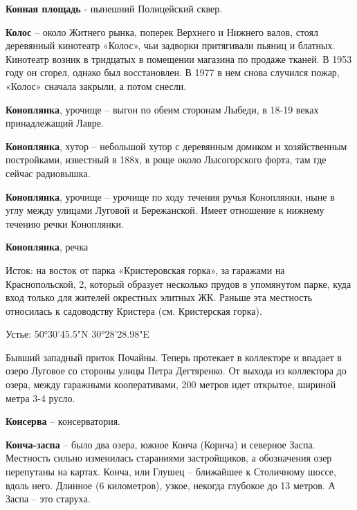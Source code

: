 \medskip

\textbf{Конная площадь} - нынешний Полицейский сквер.\\

\medskip

\textbf{Колос} – около Житнего рынка, поперек Верхнего и Нижнего валов, стоял деревянный кинотеатр «Колос», чьи задворки притягивали пьяниц и блатных. Кинотеатр возник в тридцатых в помещении магазина по продаже тканей. В 1953 году он сгорел, однако был восстановлен. В 1977 в нем снова случился пожар, «Колос» сначала закрыли, а потом снесли.\\

\medskip

\textbf{Коноплянка}, урочище – выгон по обеим сторонам Лыбеди, в 18-19 веках принадлежащий Лавре.\\

\medskip

\textbf{Коноплянка}, хутор – небольшой хутор с деревянным домиком и хозяйственным постройками, известный в 188х, в роще около Лысогорского форта, там где сейчас радиовышка.\\  

\medskip

\textbf{Коноплянка}, урочище – урочище по ходу течения ручья Коноплянки, ныне в углу между улицами Луговой и Бережанской. Имеет отношение к нижнему течению речки Коноплянки.\\

\medskip

\textbf{Коноплянка}, речка

Исток: на восток от парка «Кристеровская горка», за гаражами на Краснопольской, 2, который образует несколько прудов в упомянутом парке, куда вход только для жителей окрестных элитных ЖК. Раньше эта местность относилась к садоводству Кристера (см. Кристерская горка).

Устье: 50°30'45.5"N 30°28'28.98"E

Бывший западный приток Почайны. Теперь протекает в коллекторе и впадает в озеро Луговое со стороны улицы Петра Дегтяренко. От выхода из коллектора до озера, между гаражными кооперативами, 200 метров идет открытое, шириной метра 3-4 русло.\\

\medskip

\textbf{Консерва} – консерватория.\\

\medskip

\textbf{Конча-заспа} – было два озера, южное Конча (Корнча) и северное Заспа. Местность сильно изменилась стараниями застройщиков, а обозначения озер перепутаны на картах. Конча, или Глушец – ближайшее к Столичному шоссе, вдоль него. Длинное (6 километров), узкое, некогда глубокое до 13 метров. А Заспа – это старуха.

